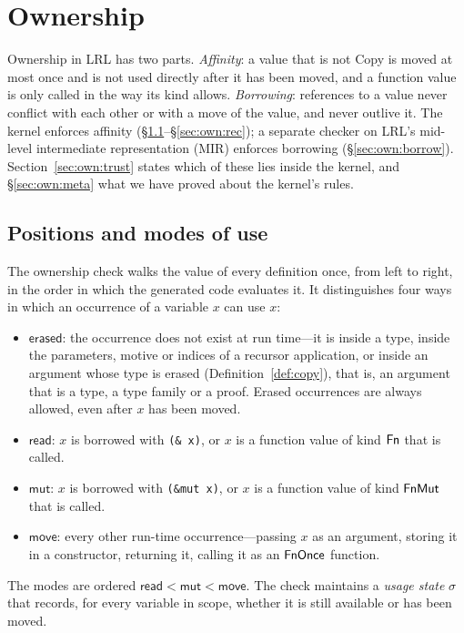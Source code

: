 \section{Ownership}\label{sec:own}

Ownership in LRL has two parts.
\emph{Affinity}: a value that is not Copy is moved at most once and is not used directly after it has been moved, and a function value is only called in the way its kind allows.
\emph{Borrowing}: references to a value never conflict with each other or with a move of the value, and never outlive it.
The kernel enforces affinity (\S\ref{sec:own:modes}--\S\ref{sec:own:rec}); a separate checker on LRL's mid-level intermediate representation (MIR) enforces borrowing (\S\ref{sec:own:borrow}).
Section~\ref{sec:own:trust} states which of these lies inside the kernel, and \S\ref{sec:own:meta} what we have proved about the kernel's rules.

\subsection{Positions and modes of use}\label{sec:own:modes}

The ownership check walks the value of every definition once, from left to right, in the order in which the generated code evaluates it.
It distinguishes four ways in which an occurrence of a variable $x$ can use $x$:
\begin{itemize}\setlength\itemsep{1pt}
\item $\mathsf{erased}$: the occurrence does not exist at run time---it is inside a type, inside the parameters, motive or indices of a recursor application, or inside an argument whose type is erased (Definition~\ref{def:copy}), that is, an argument that is a type, a type family or a proof. Erased occurrences are always allowed, even after $x$ has been moved.
\item $\mathsf{read}$: $x$ is borrowed with \lstinline|(& x)|, or $x$ is a function value of kind $\mathsf{Fn}$ that is called.
\item $\mathsf{mut}$: $x$ is borrowed with \lstinline|(&mut x)|, or $x$ is a function value of kind $\mathsf{FnMut}$ that is called.
\item $\mathsf{move}$: every other run-time occurrence---passing $x$ as an argument, storing it in a constructor, returning it, calling it as an $\mathsf{FnOnce}$ function.
\end{itemize}
The modes are ordered $\mathsf{read} < \mathsf{mut} < \mathsf{move}$.
The check maintains a \emph{usage state} $\sigma$ that records, for every variable in scope, whether it is still available or has been moved.

